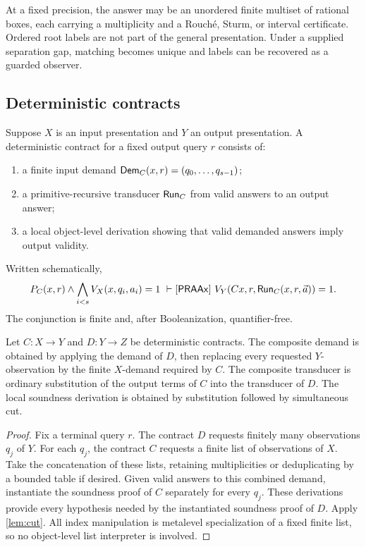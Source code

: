 \begin{example}
At a fixed precision, the answer may be an unordered finite multiset of rational boxes, each carrying a multiplicity and a Rouch\'e, Sturm, or interval certificate.  Ordered root labels are not part of the general presentation.  Under a supplied separation gap, matching becomes unique and labels can be recovered as a guarded observer.
\end{example}

\subsection{Deterministic contracts}

Suppose \(X\) is an input presentation and \(Y\) an output presentation.  A deterministic contract for a fixed output query \(r\) consists of:
\begin{enumerate}[label=(\alph*)]
  \item a finite input demand \(\mathsf{Dem}_C(x,r)=(q_0,\ldots,q_{s-1})\);
  \item a primitive-recursive transducer \(\mathsf{Run}_C\) from valid answers to an output answer;
  \item a local object-level derivation showing that valid demanded answers imply output validity.
\end{enumerate}
Written schematically,
\[
  P_C(x,r)\wedge\bigwedge_{i<s}V_X(x,q_i,a_i)=1
   \ \vdash[\mathsf{PRAAx}]\
  V_Y(Cx,r,\mathsf{Run}_C(x,r,\vec a))=1.
\]
The conjunction is finite and, after Booleanization, quantifier-free.

\begin{theorem}\label{thm:det-comp}
Let \(C:X\to Y\) and \(D:Y\to Z\) be deterministic contracts.  The composite demand is obtained by applying the demand of \(D\), then replacing every requested \(Y\)-observation by the finite \(X\)-demand required by \(C\).  The composite transducer is ordinary substitution of the output terms of \(C\) into the transducer of \(D\).  The local soundness derivation is obtained by substitution followed by simultaneous cut.
\end{theorem}

\begin{proof}
Fix a terminal query \(r\).  The contract \(D\) requests finitely many observations \(q_j\) of \(Y\).  For each \(q_j\), the contract \(C\) requests a finite list of observations of \(X\).  Take the concatenation of these lists, retaining multiplicities or deduplicating by a bounded table if desired.  Given valid answers to this combined demand, instantiate the soundness proof of \(C\) separately for every \(q_j\).  These derivations provide every hypothesis needed by the instantiated soundness proof of \(D\).  Apply \cref{lem:cut}.  All index manipulation is metalevel specialization of a fixed finite list, so no object-level list interpreter is involved.
\end{proof}

